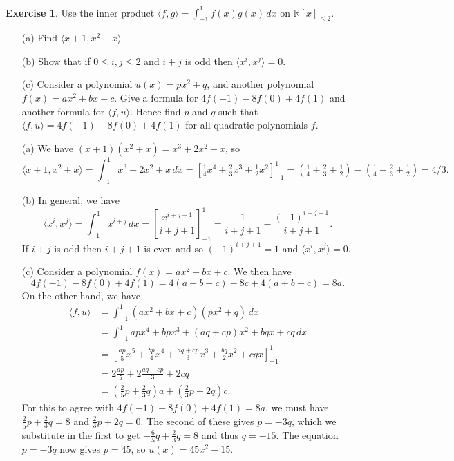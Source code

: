 \documentclass{amsart}
\newcommand{\R}         {{\mathbb{R}}}
\newcommand{\ip}[1]     {\langle #1\rangle}
\renewcommand{\:}       {\colon}
\theoremstyle{definition}
\newtheorem{exercise}{Exercise}[section]
\renewenvironment{solution}{\SolutionAtEnd}{\endSolutionAtEnd}
\begin{document}
\begin{exercise}\label{ex-quadratic-ip}
 Use the inner product $\ip{f,g}=\int_{-1}^1 f(x)g(x)\,dx$ on
 $\R[x]_{\leq 2}$.
 \begin{itemize}
  \item[(a)] Find $\ip{x+1,x^2+x}$
  \item[(b)] Show that if $0\leq i,j\leq 2$ and $i+j$ is odd then
   $\ip{x^i,x^j}=0$.
  \item[(c)] Consider a polynomial $u(x)=px^2+q$, and another
   polynomial $f(x)=ax^2+bx+c$.  Give a formula for
   $4f(-1)-8f(0)+4f(1)$ and another formula for $\ip{f,u}$.  Hence
   find $p$ and $q$ such that $\ip{f,u}=4f(-1)-8f(0)+4f(1)$ for all
   quadratic polynomials $f$.
 \end{itemize}
\end{exercise}
\begin{solution}
 \begin{itemize}
  \item[(a)] We have $(x+1)(x^2+x)=x^3+2x^2+x$, so 
   \[ \ip{x+1,x^2+x}=\int_{-1}^1 x^3+2x^2+x\,dx = 
       \left[ \tfrac{1}{4}x^4 + \tfrac{2}{3}x^3 +
        \tfrac{1}{2}x^2 \right]_{-1}^1 = 
       (\tfrac{1}{4}+\tfrac{2}{3}+\tfrac{1}{2}) - 
       (\tfrac{1}{4}-\tfrac{2}{3}+\tfrac{1}{2}) = 4/3.
   \]
  \item[(b)] In general, we have 
   \[ \ip{x^i,x^j} = \int_{-1}^1 x^{i+j}\,dx = 
       \left[ \frac{x^{i+j+1}}{i+j+1} \right]_{-1}^1 = 
        \frac{1}{i+j+1} - \frac{(-1)^{i+j+1}}{i+j+1}.
   \]
   If $i+j$ is odd then $i+j+1$ is even and so $(-1)^{i+j+1}=1$ and
   $\ip{x^i,x^j}=0$.
  \item[(c)] Consider a polynomial $f(x)=ax^2+bx+c$.  We then have 
   \[ 4f(-1)-8f(0)+4f(1) = 4 (a-b+c) -8c + 4(a+b+c) = 8a. \]
   On the other hand, we have
   \begin{align*}
    \ip{f,u} &= \int_{-1}^1 (ax^2+bx+c)(px^2+q)\,dx \\
     &= \int_{-1}^1 apx^4 + bpx^3+ (aq+cp)x^2 + bqx + cq \, dx \\
     &= \left[ \tfrac{ap}{5} x^5 + \tfrac{bp}{4} x^4 + 
         \tfrac{aq+cp}{3} x^3 + \tfrac{bq}{2} x^2 + cqx \right]_{-1}^1 \\
     &= 2\tfrac{ap}{5} + 2\tfrac{aq+cp}{3} + 2cq \\
     &= (\tfrac{2}{5}p+\tfrac{2}{3}q)a + 
        (\tfrac{2}{3}p+2q)c. 
   \end{align*}
   For this to agree with $4f(-1)-8f(0)+4f(1)=8a$, we must have
   $\tfrac{2}{5}p+\tfrac{2}{3}q=8$ and $\tfrac{2}{3}p+2q=0$.  The
   second of these gives $p=-3q$, which we substitute in the first to
   get $-\tfrac{6}{5}q+\tfrac{2}{3}q=8$ and thus $q=-15$.  The
   equation $p=-3q$ now gives $p=45$, so $u(x)=45x^2-15$.
 \end{itemize}
\end{solution}
\end{document}
